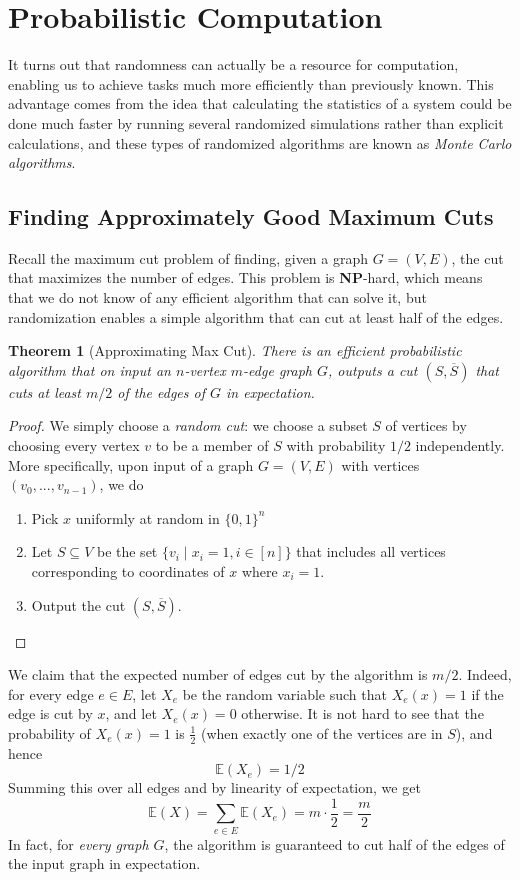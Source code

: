 \documentclass[a4paper, 12pt]{report}
\newtheorem{theorem}{Theorem}[section]
\theoremstyle{remark}
\theoremstyle{definition}
\begin{document}
\section{Probabilistic Computation}
It turns out that randomness can actually be a resource for computation, enabling us to achieve tasks much more efficiently than previously known. This advantage comes from the idea that calculating the statistics of a system could be done much faster by running several randomized simulations rather than explicit calculations, and these types of randomized algorithms are known as \textit{Monte Carlo algorithms}. 

\subsection{Finding Approximately Good Maximum Cuts}
Recall the maximum cut problem of finding, given a graph $G = (V, E)$, the cut that maximizes the number of edges. This problem is \textbf{NP}-hard, which means that we do not know of any efficient algorithm that can solve it, but randomization enables a simple algorithm that can cut at least half of the edges. 

\begin{theorem}[Approximating Max Cut]
There is an efficient probabilistic algorithm that on input an $n$-vertex $m$-edge graph $G$, outputs a cut $(S, \overline{S})$ that cuts at least $m/2$ of the edges of $G$ in expectation. 
\end{theorem}
\begin{proof}
We simply choose a \textit{random cut}: we choose a subset $S$ of vertices by choosing every vertex $v$ to be a member of $S$ with probability $1/2$ independently. More specifically, upon input of a graph $G = (V, E)$ with vertices $(v_0, ..., v_{n-1})$, we do
\begin{enumerate}
    \item Pick $x$ uniformly at random in $\{0,1\}^n$
    \item Let $S \subseteq V$ be the set $\{v_i \;|\; x_i = 1, i \in [n]\}$ that includes all vertices corresponding to coordinates of $x$ where $x_i = 1$. 
    \item Output the cut $(S, \overline{S})$. 
\end{enumerate}
\end{proof}

We claim that the expected number of edges cut by the algorithm is $m/2$. Indeed, for every edge $e \in E$, let $X_e$ be the random variable such that $X_e (x) = 1$ if the edge is cut by $x$, and let $X_e (x) = 0$ otherwise. It is not hard to see that the probability of $X_e (x) = 1$ is $\frac{1}{2}$ (when exactly one of the vertices are in $S$), and hence 
\[\mathbb{E} (X_e) = 1/2\]
Summing this over all edges and by linearity of expectation, we get
\[\mathbb{E}(X) = \sum_{e \in E} \mathbb{E}(X_e) = m \cdot \frac{1}{2} = \frac{m}{2}\]
In fact, for \textit{every graph $G$}, the algorithm is guaranteed to cut half of the edges of the input graph in expectation. 
\end{document}
